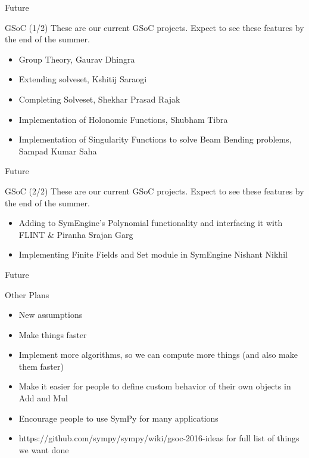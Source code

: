 \documentclass[xcolor=svgnames]{beamer}
\begin{document}
\begin{frame}{Future}
  \begin{block}{GSoC (1/2)}
    These are our current GSoC projects. Expect to see these features by the end
    of the summer.
    \begin{itemize}
    \item \normalsize Group Theory, \small Gaurav Dhingra
    \item \normalsize Extending solveset, \small Kshitij Saraogi
    \item \normalsize Completing Solveset, \small Shekhar Prasad Rajak
    \item \normalsize Implementation of Holonomic Functions, \small Shubham Tibra
    \item \normalsize Implementation of Singularity Functions to solve Beam Bending problems, \small Sampad Kumar Saha

    \end{itemize}
  \end{block}
\end{frame}

\begin{frame}{Future}
  \begin{block}{GSoC (2/2)}
    These are our current GSoC projects. Expect to see these features by the end
    of the summer.
    \begin{itemize}
    \item \normalsize Adding to SymEngine's Polynomial functionality and interfacing it with FLINT \& Piranha \small Srajan Garg
    \item \normalsize Implementing Finite Fields and Set module in SymEngine \small Nishant Nikhil
    \end{itemize}
  \end{block}
\end{frame}

\begin{frame}{Future}
\begin{block}{Other Plans}
\begin{itemize}
\item New assumptions
\item Make things faster
\item Implement more algorithms, so we can compute more things (and also make
  them faster)
\item Make it easier for people to define custom behavior of their own objects
  in Add and Mul
\item Encourage people to use SymPy for many applications
\item https://github.com/sympy/sympy/wiki/gsoc-2016-ideas for full list of
  things we want done
\end{itemize}
\end{block}
\end{frame}
\end{document}
